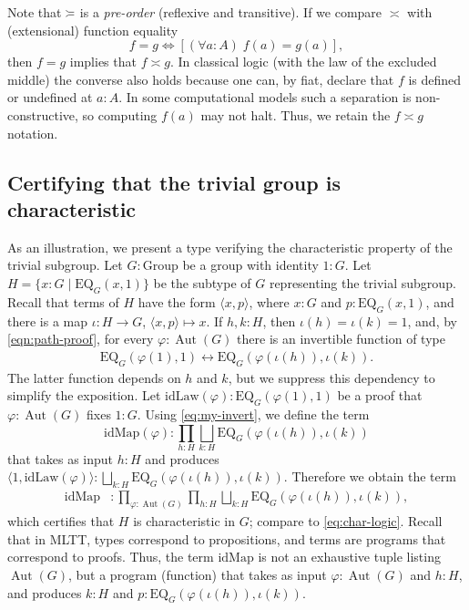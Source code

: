 \documentclass{amsart}
\numberwithin{lstfloat}{section}
\DeclareMathOperator{\Aut}{Aut}
\newcommand{\venturi}{%
  \mathrel{
    \begin{tikzpicture}[yscale=0.6,xscale=0.5]
        \draw (0ex,2.5ex) to (1ex,2ex);
        \draw (1ex,2ex) to (3ex,2ex);
        \draw (0ex,0.75ex) to (1ex,1.25ex);
        \draw (1ex,1.25ex) to (3ex,1.25ex);
    \end{tikzpicture}
  }
}
\theoremstyle{definition}
\theoremstyle{remark}
\numberwithin{equation}{section}
\begin{document}
Note that $\venturi$ is a \emph{pre-order} (reflexive and transitive).
If we compare $\asymp$ with (extensional) function equality
\[
  f=g \iff
  \left[ (\forall a:A)\; f(a)=g(a)\right], 
\]  
then $f=g$ implies that $f\asymp g$. In classical logic (with the law of the excluded middle)
the converse also holds because one can, by fiat, declare that $f$ is defined or undefined at $a:A$. 
In some computational models such a separation is non-constructive, 
so computing $f(a)$ may not halt.  Thus, 
we retain the $f\asymp g$ notation.  



\subsection{Certifying that the trivial group is characteristic}
As an illustration, we present a type verifying the characteristic property of the trivial subgroup. Let $G : \mathrm{Group}$ be a group with identity $1:G$. Let $H=\{x: G \mid \mathrm{EQ}_G(x,1)\}$ be the subtype of $G$ representing the trivial subgroup. Recall that terms of $H$ have the form $\langle x,
p\rangle$, where $x:G$ and $p:\mathrm{EQ}_G(x,1)$, and there is a map
$\iota:H\to G$,  $\langle x,p\rangle\mapsto x$. If $h,k:H$, then  $\iota(h)=\iota(k)=1$, and, by \eqref{eqn:path-proof}, for every $\varphi:\Aut(G)$ there is an 
invertible function of type
\begin{align} \label{eq:my-invert}
  \text{EQ}_G(\varphi(1),1)\longleftrightarrow \text{EQ}_G(\varphi(\iota(h)),\iota(k)).
\end{align}
The latter function depends on $h$ and $k$, but  we suppress this dependency  to simplify the exposition. Let $\mathrm{idLaw}(\varphi):\mathrm{EQ}_G(\varphi(1),1)$ be a proof that $\varphi:\Aut(G)$ fixes $1:G$. Using \eqref{eq:my-invert}, we define the term \[\mathrm{idMap}(\varphi) : \prod_{h:H}\bigsqcup_{k:H}\text{EQ}_G(\varphi(\iota(h)), \iota(k))\]that takes as input $h:H$ and produces $\langle 1,\mathrm{idLaw}(\varphi)\rangle: \bigsqcup_{k:H}\text{EQ}_G(\varphi(\iota(h)), \iota(k))$. Therefore we obtain the term 
\begin{align*}
  \mathrm{idMap} & : \prod_{\varphi:\Aut(G)}\prod_{h:H}\bigsqcup_{k:H}\text{EQ}_G(\varphi(\iota(h)), \iota(k)),
\end{align*}
which certifies that $H$ is characteristic in $G$; compare to \eqref{eq:char-logic}. 
Recall that in MLTT, types correspond to propositions, and terms are programs that correspond to proofs. Thus, the term $\mathrm{idMap}$  is not an  exhaustive tuple listing $\Aut(G)$, but a program (function) that takes as input $\varphi:\Aut(G)$ and $h:H$, and produces $k:H$ and $p:\text{EQ}_G(\varphi(\iota(h)), \iota(k))$.
\end{document}
